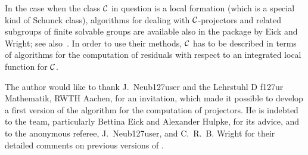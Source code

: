 In the case when the class $\cal C$ in question is a local formation (which is
a special kind of Schunck class), algorithms for dealing with $\cal
C$-projectors and related subgroups of finite solvable groups are available
also in the {\GAP} package %
by Eick and
Wright; see also~\cite{EW99}. In order to use their methods, $\cal C$ has to
be described in terms of algorithms for the computation of residuals with
respect to an integrated local function for $\cal C$.

The author would like to thank J.~Neub\accent127user and the Lehrstuhl D f\accent127ur
Mathematik, RWTH Aachen, for an invitation, which made it possible to develop a first
version of the algorithm for the computation of projectors. He is indebted to the {\GAP}
team, particularly Bettina Eick and Alexander Hulpke, for its advice, and to the
anonymous referee, J.~Neub\accent127user, and C.~R.~B. Wright for their detailed comments
on previous versions of {\CRISP}.


